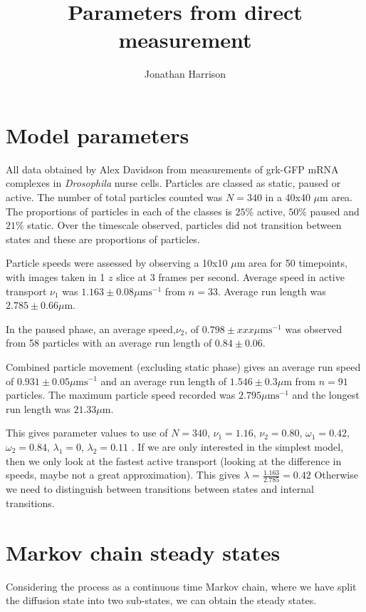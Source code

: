 \documentclass[a4paper,10pt]{article}
\title{Parameters from direct measurement}
\author{Jonathan Harrison}
\begin{document}
\maketitle

\section{Model parameters}
All data obtained by Alex Davidson from measurements of grk-GFP mRNA complexes in \textit{Drosophila} nurse cells.
Particles are classed as static, paused or active.
The number of total particles counted was $N=340$ in a 40x40 $\mu \text{m}$ area.
The proportions of particles in each of the classes is $25\%$ active, $50\%$ paused and $21\%$ static. 
Over the timescale observed, particles did not transition between states and these are proportions of particles. 

Particle speeds were assessed by observing a 10x10 $\mu \text{m}$ area for 50 timepoints, with images taken in 1 $z$ slice at 3 frames per second. Average speed in active transport $\nu_1 $ was  $1.163 \pm 0.08 \mu \text{ms}^{-1}$ from $n=33$. 
Average run length was $2.785 \pm 0.66 \mu \text{m}$. 

In the paused phase, an average speed,$\nu_2$, of $0.798 \pm xxx \mu \text{ms}^{-1}$ was observed from 58 particles with an average run length of  $0.84 \pm 0.06$. 

Combined particle movement (excluding static phase) gives an average run speed of $0.931 \pm 0.05 \mu \text{ms}^{-1} $  and an average run length of $1.546 \pm 0.3 \mu \text{m} $ from $n=91$ particles.
The maximum particle speed recorded was $2.795 \mu \text{ms}^{-1}$ and  the longest run length was $21.33 \mu \text{m}$. 

This gives parameter values to use of $N=340$, $\nu_1 = 1.16$, $\nu_2 = 0.80$, $\omega_1 = 0.42 $, $\omega_2 = 0.84$, $\lambda_1 = 0$, $\lambda_2 = 0.11$ .
If we are only interested in the simplest model, then we only look at the fastest active transport (looking at the difference in speeds, maybe not a great approximation). 
This gives $\lambda = \frac{1.163}{2.785} = 0.42$
Otherwise we need to distinguish between transitions between states and internal transitions. 

\section{Markov chain steady states}

Considering the process as a continuous time Markov chain, where we have split the diffusion state into two sub-states, we can obtain the steady states.
\end{document}
